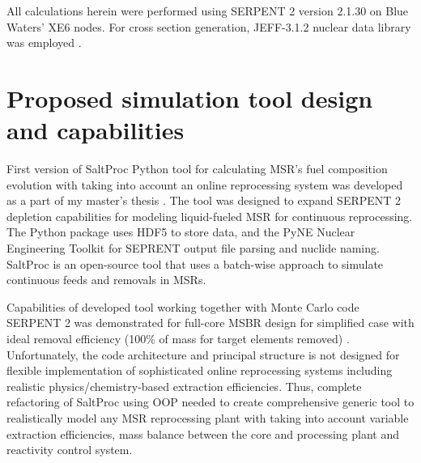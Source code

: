 All calculations herein were performed using SERPENT 2 version 2.1.30 on Blue Waters’ XE6 nodes. For cross section generation, JEFF-3.1.2 nuclear data library was employed \cite{oecd/nea_data_bank_jeff-3.1.2_2014}. 

\section{Proposed simulation tool design and capabilities} \label{sec:tool_design}
First version of SaltProc Python tool for calculating \gls{MSR}'s fuel 
composition evolution with taking into account an online reprocessing system 
was developed as a part of my master's thesis \cite{rykhlevskii_advanced_2018, rykhlevskii_arfc/saltproc_2018}. The tool was designed to 
expand SERPENT 2 depletion capabilities for modeling liquid-fueled \gls{MSR} 
for continuous reprocessing. The Python package uses HDF5 
\cite{the_hdf_group_hierarchical_1997} to store 
data, and the PyNE Nuclear Engineering Toolkit \cite{scopatz_pyne_2012}
for SEPRENT output file parsing and nuclide naming. SaltProc is an open-source tool 
that uses a batch-wise approach to simulate continuous feeds and removals in 
\glspl{MSR}. 

Capabilities of developed tool 
working together with Monte Carlo code SERPENT 2 was demonstrated for full-core 
\gls{MSBR} design for simplified case with ideal removal efficiency (100\% of 
mass for target elements removed) \cite{rykhlevskii_modeling_2019}. Unfortunately, 
the code architecture and principal structure is not designed for flexible 
implementation of sophisticated online reprocessing systems including realistic 
physics/chemistry-based extraction efficiencies. Thus, complete refactoring of 
SaltProc using \gls{OOP} needed to create comprehensive 
generic tool to realistically model any \gls{MSR} reprocessing plant with 
taking into account variable extraction efficiencies, mass balance between 
the core and processing plant and reactivity control system.

